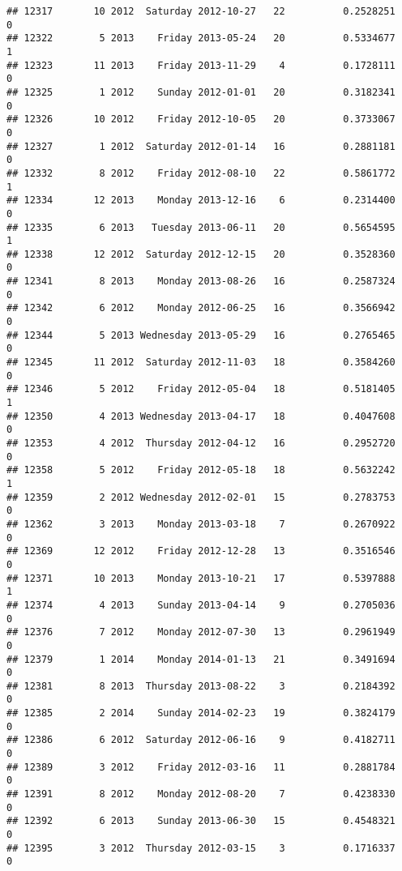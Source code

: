 \documentclass[
]{article}
\begin{document}
\begin{verbatim}
## 12317       10 2012  Saturday 2012-10-27   22          0.2528251             0
## 12322        5 2013    Friday 2013-05-24   20          0.5334677             1
## 12323       11 2013    Friday 2013-11-29    4          0.1728111             0
## 12325        1 2012    Sunday 2012-01-01   20          0.3182341             0
## 12326       10 2012    Friday 2012-10-05   20          0.3733067             0
## 12327        1 2012  Saturday 2012-01-14   16          0.2881181             0
## 12332        8 2012    Friday 2012-08-10   22          0.5861772             1
## 12334       12 2013    Monday 2013-12-16    6          0.2314400             0
## 12335        6 2013   Tuesday 2013-06-11   20          0.5654595             1
## 12338       12 2012  Saturday 2012-12-15   20          0.3528360             0
## 12341        8 2013    Monday 2013-08-26   16          0.2587324             0
## 12342        6 2012    Monday 2012-06-25   16          0.3566942             0
## 12344        5 2013 Wednesday 2013-05-29   16          0.2765465             0
## 12345       11 2012  Saturday 2012-11-03   18          0.3584260             0
## 12346        5 2012    Friday 2012-05-04   18          0.5181405             1
## 12350        4 2013 Wednesday 2013-04-17   18          0.4047608             0
## 12353        4 2012  Thursday 2012-04-12   16          0.2952720             0
## 12358        5 2012    Friday 2012-05-18   18          0.5632242             1
## 12359        2 2012 Wednesday 2012-02-01   15          0.2783753             0
## 12362        3 2013    Monday 2013-03-18    7          0.2670922             0
## 12369       12 2012    Friday 2012-12-28   13          0.3516546             0
## 12371       10 2013    Monday 2013-10-21   17          0.5397888             1
## 12374        4 2013    Sunday 2013-04-14    9          0.2705036             0
## 12376        7 2012    Monday 2012-07-30   13          0.2961949             0
## 12379        1 2014    Monday 2014-01-13   21          0.3491694             0
## 12381        8 2013  Thursday 2013-08-22    3          0.2184392             0
## 12385        2 2014    Sunday 2014-02-23   19          0.3824179             0
## 12386        6 2012  Saturday 2012-06-16    9          0.4182711             0
## 12389        3 2012    Friday 2012-03-16   11          0.2881784             0
## 12391        8 2012    Monday 2012-08-20    7          0.4238330             0
## 12392        6 2013    Sunday 2013-06-30   15          0.4548321             0
## 12395        3 2012  Thursday 2012-03-15    3          0.1716337             0

\end{verbatim}
\end{document}
